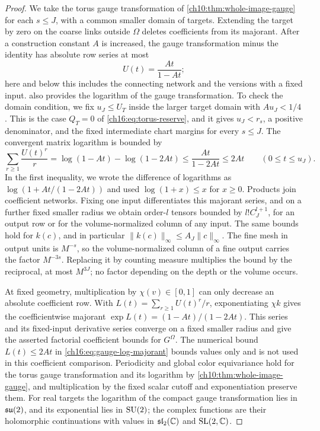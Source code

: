 \begin{proof}
We take the torus gauge transformation of \cref{ch10:thm:whole-image-gauge} for each $s\le J$, with a common smaller domain of targets. Extending the target by zero on the coarse links outside $\Omega$ deletes coefficients from its majorant. After a construction constant $A$ is increased, the gauge transformation minus the identity has absolute row series at most
\[
 U(t)=\frac{At}{1-At};
\]
here and below this includes the connecting network and the versions with a fixed input.  also provides the logarithm of the gauge transformation. To check the domain condition, we fix $u_J\le U_T$ inside the larger target domain with $Au_J<1/4$. This is the case $Q_T=0$ of \eqref{ch16:eq:torus-reserve}, and it gives $u_J<r_s$, a positive denominator, and the fixed intermediate chart margins for every $s\le J$. The convergent matrix logarithm is bounded by
\begin{equation}\label{ch16:eq:gauge-log-majorant}
 \sum_{r\ge1}\frac{U(t)^r}{r}
   =\log(1-At)-\log(1-2At)
   \le\frac{At}{1-2At}\le2At\qquad(0\le t\le u_J).
\end{equation}
In the first inequality, we wrote the difference of logarithms as $\log(1+At/(1-2At))$ and used $\log(1+x)\le x$ for $x\ge0$. Products join coefficient networks. Fixing one input differentiates this majorant series, and on a further fixed smaller radius we obtain order-$l$ tensors bounded by $l!C_J^{l+1}$, for an output row or for the volume-normalized column of any input. The same bounds hold for $k(c)$, and in particular $\|k(c)\|_\infty\le A_J\|c\|_\infty$. The fine mesh in output units is $M^{-s}$, so the volume-normalized column of a fine output carries the factor $M^{-3s}$. Replacing it by counting measure multiplies the bound by the reciprocal, at most $M^{3J}$; no factor depending on the depth or the volume occurs.

At fixed geometry, multiplication by $\chi(v)\in[0,1]$ can only decrease an absolute coefficient row. With $L(t)=\sum_{r\ge1}U(t)^r/r$, exponentiating $\chi k$ gives the coefficientwise majorant $\exp L(t)=(1-At)/(1-2At)$. This series and its fixed-input derivative series converge on a fixed smaller radius and give the asserted factorial coefficient bounds for $G^\Omega$. The numerical bound $L(t)\le2At$ in \eqref{ch16:eq:gauge-log-majorant} bounds values only and is not used in this coefficient comparison. Periodicity and global color equivariance hold for the torus gauge transformation and its logarithm by \cref{ch10:thm:whole-image-gauge}, and multiplication by the fixed scalar cutoff and exponentiation preserve them. For real targets the logarithm of the compact gauge transformation lies in $\mathfrak{su}(2)$, and its exponential lies in $\mathrm{SU}(2)$; the complex functions are their holomorphic continuations with values in $\mathfrak{sl}_2(\mathbb C)$ and $\mathrm{SL}(2,\mathbb C)$.


\end{proof}
